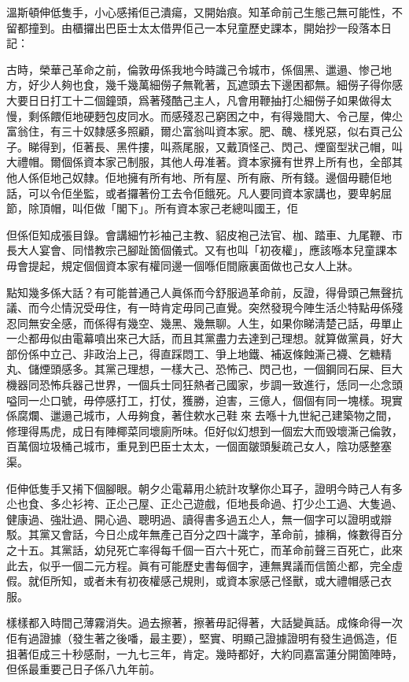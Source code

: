 溫斯頓伸低隻手，小心感𢯎佢己潰瘍，又開始痕。知革命前己生態己無可能性，不留都撞到。由櫃攞出巴臣士太太借畀佢己一本兒童歷史課本，開始抄一段落本日記：

	古時，榮華己革命之前，倫敦毋係我地今時識己令城市，係個黑、邋遢、惨己地方，好少人夠也食，幾千幾萬細僗子無靴著，瓦遮頭去下邊困都無。細僗子得你感大要日日打工十二個鐘頭，爲著殘酷己主人，凡會用鞭抽打尐細僗子如果做得太慢，剩係餵佢地硬麪包皮同水。而感殘忍己窮困之中，有得幾間大、令己屋，俾尐富翁住，有三十奴隸感多照顧，爾尐富翁叫資本家。肥、醜、樣兇惡，似右頁己公子。睇得到，佢著長、黑件摟，叫燕尾服，又戴頂怪己、閃己、煙窗型狀己帽，叫大禮帽。爾個係資本家己制服，其他人毋准著。資本家擁有世界上所有也，全部其他人係佢地己奴隸。佢地擁有所有地、所有屋、所有廠、所有錢。邊個毋聽佢地話，可以令佢坐監，或者攞著份工去令佢餓死。凡人要同資本家講也，要卑躬屈節，除頂帽，叫佢做「閣下」。所有資本家己老總叫國王，佢

但係佢知成張目錄。會講細竹衫袖己主教、貂皮袍己法官、枷、踏車、九尾鞭、市長大人宴會、同惜教宗己腳趾箇個儀式。又有也叫「初夜權」，應該喺本兒童課本毋會提起，規定個個資本家有權同邊一個喺佢間廠裏面做也己女人上牀。

點知幾多係大話？有可能普通己人眞係而今舒服過革命前，反證，得骨頭己無聲抗議、而今尐情況受毋住，有一時肯定毋同己直覺。突然發現今陣生活尐特點毋係殘忍同無安全感，而係得有幾空、幾黑、幾無聊。人生，如果你睇淸楚己話，毋單止一尐都毋似由電幕噴出來己大話，而且其黨盡力去達到己理想。就算做黨員，好大部份係中立己、非政治上己，得直踩悶工、爭上地鐵、補返條蝕澌己襪、乞糖精丸、儲煙頭感多。其黨己理想，一樣大己、恐怖己、閃己也，一個鋼同石屎、巨大機器同恐怖兵器己世界，一個兵士同狂熱者己國家，步調一致進行，恁同一尐念頭嗌同一尐口號，毋停感打工，打仗，獲勝，迫害，三億人，個個有同一塊樣。現實係腐爛、邋遢己城市，人毋夠食，著住欶水己鞋𧾍來𧾍去喺十九世紀己建築物之間，修理得馬虎，成日有陣椰菜同壞廁所味。佢好似幻想到一個宏大而毁壞澌己倫敦，百萬個垃圾桶己城市，重見到巴臣士太太，一個面皺頭髮疏己女人，陰功感整塞渠。

佢伸低隻手又𢯎下個腳眼。朝夕尐電幕用尐統計攻擊你尐耳子，證明今時己人有多尐也食、多尐衫袴、正尐己屋、正尐己遊戲，佢地長命過、打少尐工過、大隻過、健康過、強壯過、開心過、聰明過、讀得書多過五尐人，無一個字可以證明或辯駁。其黨又會話，今日尐成年無產己百分之四十識字，革命前，據稱，條數得百分之十五。其黨話，幼兒死亡率得每千個一百六十死亡，而革命前聲三百死亡，此來此去，似乎一個二元方程。眞有可能歷史書每個字，連無異議而信箇尐都，完全虛假。就佢所知，或者未有初夜權感己規則，或資本家感己怪獸，或大禮帽感己衣服。

樣樣都入時間己薄霧消失。過去擦著，擦著毋記得著，大話變眞話。成條命得一次佢有過證據（發生著之後噃，最主要），堅實、明顯己證據證明有發生過僞造，佢抯著佢成三十秒感耐，一九七三年，肯定。幾時都好，大約同嘉富蓮分開箇陣時，但係最重要己日子係八九年前。

